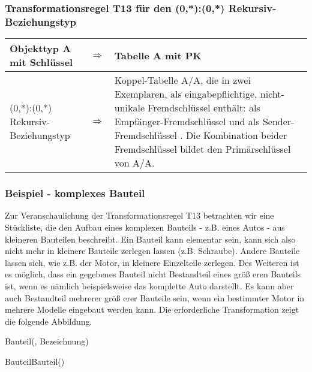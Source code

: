 \subsubsection{Transformationsregel T13 für den (0,*):(0,*) Rekursiv-Beziehungstyp}
\begin{supertabular}[h]{|l|l|p{9cm}|}
    \footnotesize Objekttyp A mit Schlüssel  & $\Rightarrow $ & \footnotesize Tabelle A mit PK \\
    \hline
    \footnotesize (0,*):(0,*) Rekursiv-Beziehungstyp & $\Rightarrow $ & \footnotesize Koppel-Tabelle A/A, die  in zwei Exemplaren, als eingabepflichtige, nicht-unikale Fremdschlüssel enthält: als Empfänger-Fremdschlüssel  und als Sender-Fremdschlüssel . Die Kombination beider Fremdschlüssel bildet den Primärschlüssel von A/A.\\
\end{supertabular}


\subsubsection{Beispiel - komplexes Bauteil}
Zur Veranschaulichung der Transformationsregel T13 betrachten wir eine Stückliste, die den Aufbau eines komplexen Bauteils - z.B. eines Autos - aus kleineren Bauteilen beschreibt. Ein Bauteil kann elementar sein, kann sich also nicht mehr in kleinere Bauteile zerlegen lassen (z.B. Schraube). Andere Bauteile lassen sich, wie z.B. der Motor, in kleinere Einzelteile zerlegen. Des Weiteren ist es möglich, dass ein gegebenes Bauteil nicht Bestandteil eines größ eren Bauteils ist, wenn es nämlich beispielsweise das komplette Auto darstellt. Es kann aber auch Bestandteil mehrerer größ erer Bauteile sein, wenn ein bestimmter Motor in mehrere Modelle eingebaut werden kann. Die erforderliche Transformation zeigt die folgende Abbildung.
\begin{center}
\end{center}
\begin{small}
    Bauteil(, Bezeichnung)

    BauteilBauteil()
\end{small}

